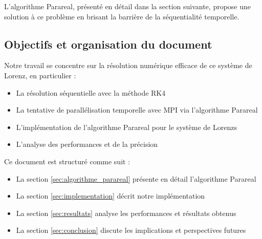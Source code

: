     L'algorithme Parareal, présenté en détail dans la section suivante, propose une solution à ce problème en brisant la barrière de la séquentialité temporelle.
    
    

\subsection{Objectifs et organisation du document}
Notre travail se concentre sur la résolution numérique efficace de ce système de Lorenz, en particulier :
\begin{itemize}
    \item La résolution séquentielle avec la méthode RK4
    \item La tentative de parallélisation temporelle avec MPI via l'algorithme Parareal
    \item L'implémentation de l'algorithme Parareal pour le système de Lorenzs
    \item L'analyse des performances et de la précision
\end{itemize}

Ce document est structuré comme suit :
\begin{itemize}
    \item La section \ref{sec:algorithme_parareal} présente en détail l'algorithme Parareal
    \item La section \ref{sec:implementation} décrit notre implémentation
    \item La section \ref{sec:resultats} analyse les performances et résultats obtenus
    \item La section \ref{sec:conclusion} discute les implications et perspectives futures
\end{itemize}